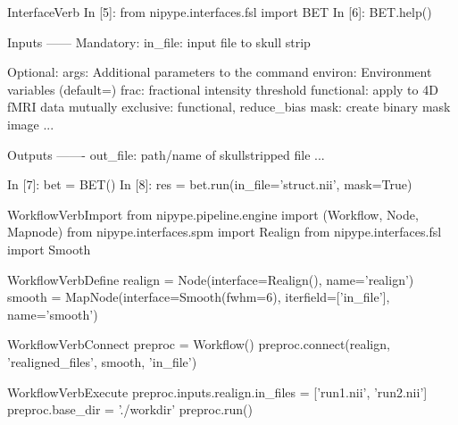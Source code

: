 \documentclass[portrait,final]{baposter}
\begin{document}
\begin{poster}
\begin{SaveVerbatim}{InterfaceVerb}
In [5]: from nipype.interfaces.fsl import BET
In [6]: BET.help()

Inputs
------
Mandatory:
 in_file: input file to skull strip

Optional:
 args: Additional parameters to the command
 environ: Environment variables (default={})
 frac: fractional intensity threshold
 functional: apply to 4D fMRI data
  mutually exclusive: functional, reduce_bias
 mask: create binary mask image
...

Outputs
-------
out_file: path/name of skullstripped file
...

In [7]: bet = BET()
In [8]: res = bet.run(in_file='struct.nii', mask=True)
\end{SaveVerbatim}


\begin{SaveVerbatim}{WorkflowVerbImport}
from nipype.pipeline.engine import (Workflow,
                                    Node, Mapnode)
from nipype.interfaces.spm import Realign
from nipype.interfaces.fsl import Smooth
\end{SaveVerbatim}

\begin{SaveVerbatim}{WorkflowVerbDefine}
realign = Node(interface=Realign(), name='realign')
smooth = MapNode(interface=Smooth(fwhm=6),
                 iterfield=['in_file'], name='smooth')
\end{SaveVerbatim}

\begin{SaveVerbatim}{WorkflowVerbConnect}
preproc = Workflow()
preproc.connect(realign, 'realigned_files',
                smooth, 'in_file')
\end{SaveVerbatim}

\begin{SaveVerbatim}{WorkflowVerbExecute}
preproc.inputs.realign.in_files = ['run1.nii', 'run2.nii']
preproc.base_dir = './workdir'
preproc.run()
\end{SaveVerbatim}


\end{poster}
\end{document}
